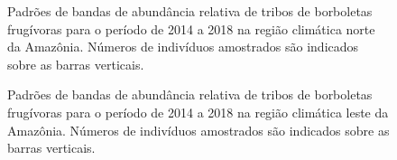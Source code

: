 \documentclass[
  letterpaper,
]{scrbook}
\begin{document}
\begin{figure}[H]


\caption{\label{fig-regiao-climatica-norte-amazonica}Padrões de bandas
de abundância relativa de tribos de borboletas frugívoras para o período
de 2014 a 2018 na região climática norte da Amazônia. Números de
indivíduos amostrados são indicados sobre as barras verticais.}

\end{figure}%

\begin{figure}[H]


\caption{\label{fig-regiao-climatica-leste-amazonica}Padrões de bandas
de abundância relativa de tribos de borboletas frugívoras para o período
de 2014 a 2018 na região climática leste da Amazônia. Números de
indivíduos amostrados são indicados sobre as barras verticais.}

\end{figure}%
\end{document}
